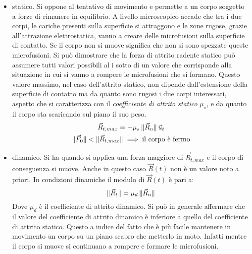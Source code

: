 \begin{itemize}
	\item statico. Si oppone al tentativo di movimento e permette a un corpo soggetto a forze di rimanere in equilibrio. A livello microscopico accade che tra i due corpi, le cariche presenti sulla superficie si attraggono e le zone rugose, grazie all'attrazione elettrostatica, vanno a creare delle microfusioni sulla superficie di contatto. Se il corpo non si muove significa che non si sono spezzate queste microfusioni. Si può dimostrare che la forza di attrito radente statico può assumere tutti valori possibili al i sotto di un valore che corrisponde alla situazione in cui si vanno a rompere le microfusioni che si formano. Questo valore massimo, nel caso dell'attrito statico, non dipende dall'estensione della superficie di contatto ma da quanto sono rugosi i due corpi interessati, aspetto che si caratterizza con il \emph{coefficiente di attrito statico} $\mu_s$, e da quanto il corpo sta scaricando sul piano il suo peso.
	\begin{gather*}
		\vec{R}_{t, max}=-\mu_s\,\lVert\vec{R}_n\rVert\,\vec{u}_t \\
		\lVert\vec{F}_0\rVert<\lVert\vec{R}_{t, max}\rVert \implies \text{il corpo è fermo}
	\end{gather*}
	\item dinamico. Si ha quando si applica una forza maggiore di $\vec{R}_{t, max}$ e il corpo di conseguenza si muove. Anche in questo caso $\vec{R}(t)$ non è un valore noto a priori. In condizioni dinamiche il modulo di $\vec{R}(t)$ è pari a:
	\[
		\lVert\vec{R}_t\rVert=\mu_d\,\lVert\vec{R}_{n}\rVert
	\]
	Dove $\mu_d$ è il coefficiente di attrito dinamico. Si può in generale affermare che il valore del coefficiente di attrito dinamico è inferiore a quello del coefficiente di attrito statico. Questo a indice del fatto che è più facile mantenere in movimento un corpo su un piano scabro che metterlo in moto. Infatti mentre il corpo si muove si continuano a rompere e formare le microfusioni.
\end{itemize}

